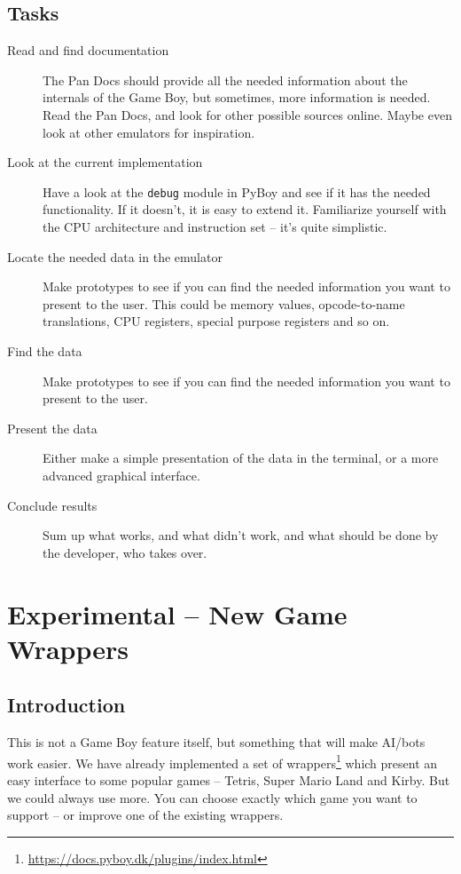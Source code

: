 \documentclass[11pt]{report} %
\begin{document}
\section*{Tasks}
\begin{description}
    \item [Read and find documentation]
        The Pan Docs should provide all the needed information about the internals of the Game Boy, but sometimes, more information is needed. Read the Pan Docs, and look for other possible sources online. Maybe even look at other emulators for inspiration.

    \item [Look at the current implementation]
        Have a look at the \texttt{debug} module in PyBoy and see if it has the needed functionality. If it doesn't, it is easy to extend it. Familiarize yourself with the CPU architecture and instruction set -- it's quite simplistic.

    \item [Locate the needed data in the emulator]
        Make prototypes to see if you can find the needed information you want to present to the user. This could be memory values, opcode-to-name translations, CPU registers, special purpose registers and so on.

    \item [Find the data]
        Make prototypes to see if you can find the needed information you want to present to the user.

    \item [Present the data]
        Either make a simple presentation of the data in the terminal, or a more advanced graphical interface.

    \item [Conclude results]
        Sum up what works, and what didn't work, and what should be done by the developer, who takes over.

\end{description}

\chapter*{Experimental -- New Game Wrappers}
\section*{Introduction}
This is not a Game Boy feature itself, but something that will make AI/bots work easier. We have already implemented a set of wrappers\footnote{\url{https://docs.pyboy.dk/plugins/index.html}} which present an easy interface to some popular games -- Tetris, Super Mario Land and Kirby. But we could always use more. You can choose exactly which game you want to support -- or improve one of the existing wrappers.
\end{document}
